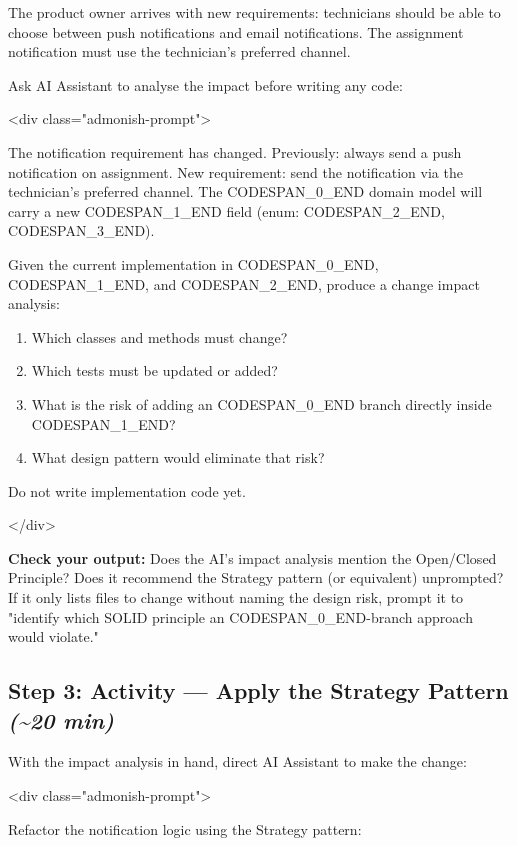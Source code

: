 \documentclass[11pt,a4paper]{book}
\begin{document}
The product owner arrives with new requirements: technicians should be able to choose between push notifications and email notifications. The assignment notification must use the technician's preferred channel.

Ask AI Assistant to analyse the impact before writing any code:

<div class="admonish-prompt">

The notification requirement has changed. Previously: always send a push notification on assignment. New requirement: send the notification via the technician's preferred channel. The CODESPAN\_0\_END domain model will carry a new CODESPAN\_1\_END field (enum: CODESPAN\_2\_END, CODESPAN\_3\_END).

Given the current implementation in CODESPAN\_0\_END, CODESPAN\_1\_END, and CODESPAN\_2\_END, produce a change impact analysis:
\begin{enumerate}
  \item Which classes and methods must change?
  \item Which tests must be updated or added?
  \item What is the risk of adding an CODESPAN\_0\_END branch directly inside CODESPAN\_1\_END?
  \item What design pattern would eliminate that risk?
\end{enumerate}

Do not write implementation code yet.

</div>

\textbf{Check your output:} Does the AI's impact analysis mention the Open/Closed Principle? Does it recommend the Strategy pattern (or equivalent) unprompted? If it only lists files to change without naming the design risk, prompt it to "identify which SOLID principle an CODESPAN\_0\_END-branch approach would violate."

\subsection{Step 3: Activity --- Apply the Strategy Pattern \textit{(\textasciitilde{}20 min)}}

With the impact analysis in hand, direct AI Assistant to make the change:

<div class="admonish-prompt">

Refactor the notification logic using the Strategy pattern:
\end{document}

